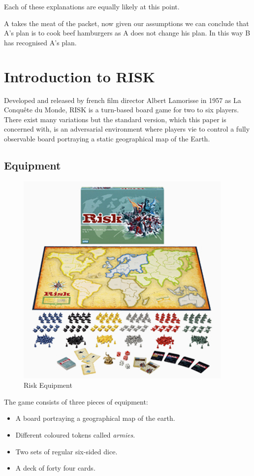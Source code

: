 \documentclass[parskip]{cs4rep}
\begin{document}
Each of these explanations are equally likely at this point.

A takes the meat of the packet, now given our assumptions we can conclude that A's plan is to cook beef hamburgers as A does not change his plan. In this way B has recognised A's plan.

\newpage

\section{Introduction to RISK}

Developed and released by french film director Albert Lamorisse in 1957 as La Conqu\^ete du Monde, RISK is a turn-based board game for two to six players. There exist many variations but the standard version, which this paper is concerned with, is an adversarial environment where players vie to control a fully observable board portraying a static geographical map of the Earth.

\subsection{Equipment}

\begin{figure}[h]
\centering
\includegraphics{images/risk-board}
\caption{Risk Equipment}
\label{fig:risk-equipment}
\end{figure}

The game consists of three pieces of equipment:

\begin{itemize}
\item
A board portraying a geographical map of the earth.
\item
Different coloured tokens called \textit{armies}.
\item
Two sets of regular six-sided dice.
\item
A deck of forty four cards.
\end{itemize}
\end{document}
